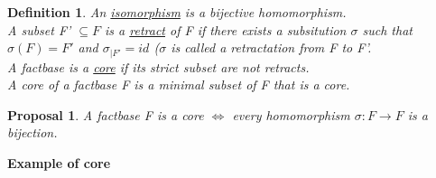 \documentclass{article}
\newtheorem{pro}{Proposal}
\newtheorem{defi}{Definition}
\begin{document}
\begin{defi}
An \underline{isomorphism} is a bijective homomorphism. \\
A subset F' $\subseteq F$ is a \underline{retract} of F if there exists a subsitution $\sigma$ such that $\sigma(F) = F'$ and $\sigma_{|F'}=id$ ($\sigma$ is called a retractation from F to F'. \\
A factbase is a \underline{core} if its strict subset are not retracts. \\
A core of a factbase F is a minimal subset of F that is a core.
\end{defi}

\begin{pro}
A factbase F is a core $\Leftrightarrow$ every homomorphism $\sigma: F \to F$ is a bijection.
\end{pro}

\textbf{Example of core}
\end{document}

